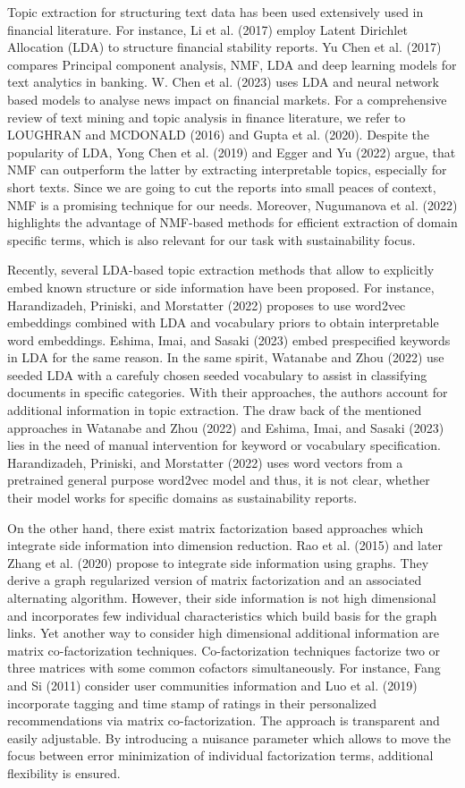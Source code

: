 \documentclass[
]{article}
\begin{document}
Topic extraction for structuring text data has been used extensively used in financial literature. For instance, Li et al. (2017) employ Latent Dirichlet Allocation (LDA) to structure financial stability reports. Yu Chen et al. (2017) compares Principal component analysis, NMF, LDA and deep learning models for text analytics in banking. W. Chen et al. (2023) uses LDA and neural network based models to analyse news impact on financial markets. For a comprehensive review of text mining and topic analysis in finance literature, we refer to LOUGHRAN and MCDONALD (2016) and Gupta et al. (2020). Despite the popularity of LDA, Yong Chen et al. (2019) and Egger and Yu (2022) argue, that NMF can outperform the latter by extracting interpretable topics, especially for short texts. Since we are going to cut the reports into small peaces of context, NMF is a promising technique for our needs. Moreover, Nugumanova et al. (2022) highlights the advantage of NMF-based methods for efficient extraction of domain specific terms, which is also relevant for our task with sustainability focus.

Recently, several LDA-based topic extraction methods that allow to explicitly embed known structure or side information have been proposed. For instance, Harandizadeh, Priniski, and Morstatter (2022) proposes to use word2vec embeddings combined with LDA and vocabulary priors to obtain interpretable word embeddings. Eshima, Imai, and Sasaki (2023) embed prespecified keywords in LDA for the same reason. In the same spirit, Watanabe and Zhou (2022) use seeded LDA with a carefuly chosen seeded vocabulary to assist in classifying documents in specific categories. With their approaches, the authors account for additional information in topic extraction. The draw back of the mentioned approaches in Watanabe and Zhou (2022) and Eshima, Imai, and Sasaki (2023) lies in the need of manual intervention for keyword or vocabulary specification. Harandizadeh, Priniski, and Morstatter (2022) uses word vectors from a pretrained general purpose word2vec model and thus, it is not clear, whether their model works for specific domains as sustainability reports.

On the other hand, there exist matrix factorization based approaches which integrate side information into dimension reduction. Rao et al. (2015) and later Zhang et al. (2020) propose to integrate side information using graphs. They derive a graph regularized version of matrix factorization and an associated alternating algorithm. However, their side information is not high dimensional and incorporates few individual characteristics which build basis for the graph links. Yet another way to consider high dimensional additional information are matrix co-factorization techniques.
Co-factorization techniques factorize two or three matrices with some common cofactors simultaneously. For instance, Fang and Si (2011) consider user communities information and Luo et al. (2019) incorporate tagging and time stamp of ratings in their personalized recommendations via matrix co-factorization. The approach is transparent and easily adjustable. By introducing a nuisance parameter which allows to move the focus between error minimization of individual factorization terms, additional flexibility is ensured.
\end{document}
